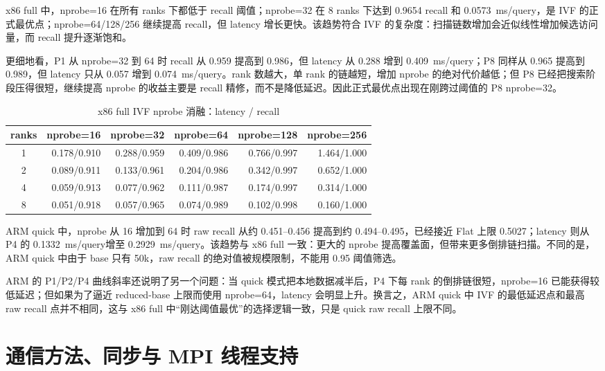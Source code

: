 \documentclass[11pt,a4paper]{article}
\newcommand{\msq}{ms/query}
\begin{document}
x86 full 中，nprobe=16 在所有 ranks 下都低于 recall 阈值；nprobe=32 在 8 ranks 下达到 0.9654 recall 和 0.0573~\msq，是 IVF 的正式最优点；nprobe=64/128/256 继续提高 recall，但 latency 增长更快。该趋势符合 IVF 的复杂度：扫描链数增加会近似线性增加候选访问量，而 recall 提升逐渐饱和。

更细地看，P1 从 nprobe=32 到 64 时 recall 从 0.959 提高到 0.986，但 latency 从 0.288 增到 0.409~\msq；P8 同样从 0.965 提高到 0.989，但 latency 只从 0.057 增到 0.074~\msq。rank 数越大，单 rank 的链越短，增加 nprobe 的绝对代价越低；但 P8 已经把搜索阶段压得很短，继续提高 nprobe 的收益主要是 recall 精修，而不是降低延迟。因此正式最优点出现在刚跨过阈值的 P8 nprobe=32。

\begin{table}[H]
\centering
\small
\caption{x86 full IVF nprobe 消融：latency / recall}
\begin{tabular}{crrrrr}
\toprule
ranks & nprobe=16 & nprobe=32 & nprobe=64 & nprobe=128 & nprobe=256 \\
\midrule
1 & 0.178/0.910 & 0.288/0.959 & 0.409/0.986 & 0.766/0.997 & 1.464/1.000 \\
2 & 0.089/0.911 & 0.133/0.961 & 0.204/0.986 & 0.342/0.997 & 0.652/1.000 \\
4 & 0.059/0.913 & 0.077/0.962 & 0.111/0.987 & 0.174/0.997 & 0.314/1.000 \\
8 & 0.051/0.918 & 0.057/0.965 & 0.074/0.989 & 0.102/0.998 & 0.160/1.000 \\
\bottomrule
\end{tabular}
\label{tab:x86_nprobe}
\end{table}

ARM quick 中，nprobe 从 16 增加到 64 时 raw recall 从约 0.451--0.456 提高到约 0.494--0.495，已经接近 Flat 上限 0.5027；latency 则从 P4 的 0.1332~\msq 增至 0.2929~\msq。该趋势与 x86 full 一致：更大的 nprobe 提高覆盖面，但带来更多倒排链扫描。不同的是，ARM quick 中由于 base 只有 50k，raw recall 的绝对值被规模限制，不能用 0.95 阈值筛选。

ARM 的 P1/P2/P4 曲线斜率还说明了另一个问题：当 quick 模式把本地数据减半后，P4 下每 rank 的倒排链很短，nprobe=16 已能获得较低延迟；但如果为了逼近 reduced-base 上限而使用 nprobe=64，latency 会明显上升。换言之，ARM quick 中 IVF 的最低延迟点和最高 raw recall 点并不相同，这与 x86 full 中“刚达阈值最优”的选择逻辑一致，只是 quick raw recall 上限不同。

\section{通信方法、同步与 MPI 线程支持}
\end{document}
